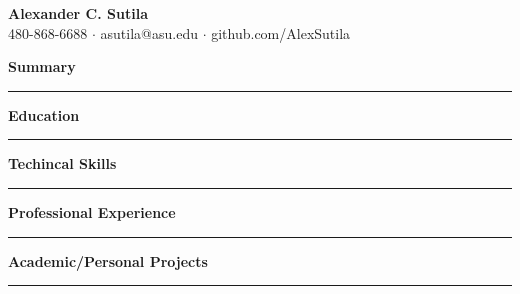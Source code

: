 \documentclass{article}
\begin{document}
\hspace{0.7em}\parbox[c]{0.5\linewidth}{
    \LARGE{\textbf{Alexander C. Sutila}}\\
    \normalsize{480-868-6688 $\cdot$ asutila@asu.edu $\cdot$ github.com/AlexSutila}
}
\hfill {}
\vspace{0.5em}

\noindent\large{\textbf{Summary}}\\[-0.6em]
\noindent\rule{\textwidth}{0.4pt}
\begin{normalsize}
    
\end{normalsize}
\vspace{0.9em}


\noindent\large{\textbf{Education}}\\[-0.6em]
\noindent\rule{\textwidth}{0.4pt}
\begin{normalsize}
    
\end{normalsize}
\vspace{0.7em}


\noindent\large{\textbf{Techincal Skills}}\\[-0.6em]
\noindent\rule{\textwidth}{0.4pt}
\begin{normalsize}
    
\end{normalsize}
\vspace{0.7em}


\noindent\large{\textbf{Professional Experience}}\\[-0.6em]
\noindent\rule{\textwidth}{0.4pt}
\begin{normalsize}
    
\end{normalsize}
\vspace{0.7em}


\noindent\large{\textbf{Academic/Personal Projects}}\\[-0.6em]
\noindent\rule{\textwidth}{0.4pt}
\begin{normalsize}
    
\end{normalsize}
\vspace{0.7em}
\end{document}
